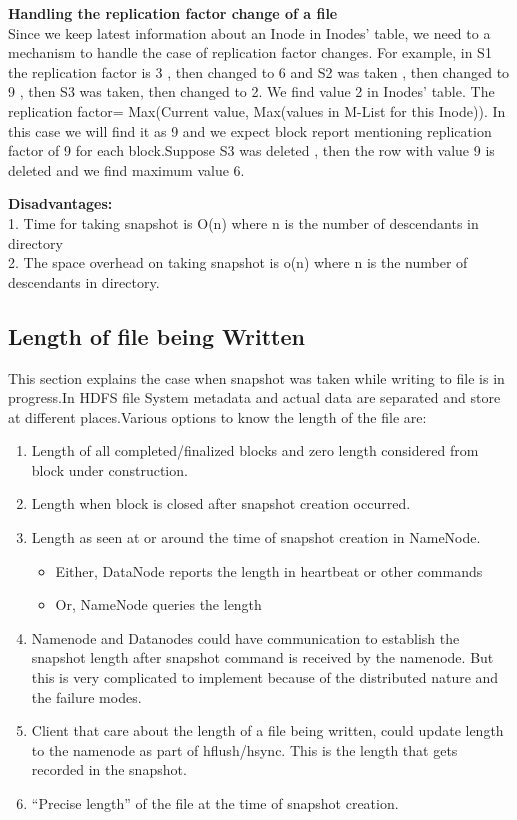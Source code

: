 \textbf{Handling the replication factor change of a file}\\
Since we keep latest information about an Inode in Inodes’ table, we need to a mechanism to handle the case of replication factor changes. For example, in S1 the replication factor is 3 , then changed to 6 and S2 was taken , then changed to 9 , then S3 was taken, then changed to 2.
We find value 2 in Inodes’ table. The replication factor= Max(Current value, Max(values in M-List for this Inode)). In this case we will find it as 9 and we expect block report mentioning replication factor of 9 for each block.Suppose S3 was deleted , then the row with value 9 is deleted and we find maximum value 6. 

\textbf{Disadvantages:}\\
1. Time for taking snapshot is O(n) where n is the number of descendants  in directory \\
2. The space overhead on taking snapshot is o(n) where n is the number of descendants in directory.

\subsection{Length of file being Written}
This section explains the case when snapshot was taken while writing to file is in progress.In HDFS file System metadata and actual data are separated and store at different places.Various options to know the length of the file are:
\begin{enumerate}
 \item Length of all completed/finalized blocks and zero length considered from block under
construction.
\item Length when block is closed after snapshot creation occurred.
\item Length as seen at or around the time of snapshot creation in NameNode.
\begin{itemize}
 \item Either, DataNode reports the length in heartbeat or other commands
\item  Or, NameNode queries the length
\end{itemize}

\item Namenode and Datanodes could have communication to establish the snapshot length after
snapshot command is received by the namenode. But this is very complicated to implement
because of the distributed nature and the failure modes.
\item Client that care about the length of a file being written, could update length to the namenode as part of hflush/hsync. This is the length that gets recorded in the snapshot.
\item “Precise length” of the file at the time of snapshot creation.

\end{enumerate}

